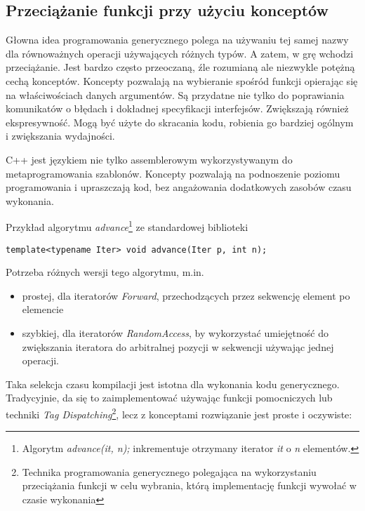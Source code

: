 \documentclass[11pt, a4paper]{article}
\begin{document}
\lstset{language=C++}

\subsection{Przeciążanie funkcji przy użyciu konceptów}

Głowna idea programowania generycznego polega na używaniu tej samej nazwy dla równoważnych operacji używających różnych typów. A zatem, w grę wchodzi przeciążanie. Jest bardzo często przeoczaną, źle rozumianą ale niezwykle potężną cechą konceptów. Koncepty pozwalają na wybieranie spośród funkcji opierając się na właściwościach danych argumentów. Są przydatne nie tylko do poprawiania komunikatów o błędach i dokładnej specyfikacji interfejsów. Zwiększają również ekspresywność. Mogą być użyte do skracania kodu, robienia go bardziej ogólnym i zwiększania wydajności.

C++ jest językiem nie tylko assemblerowym wykorzystywanym do metaprogramowania szablonów. Koncepty pozwalają na podnoszenie poziomu programowania i upraszczają kod, bez angażowania dodatkowych zasobów czasu wykonania.

Przykład algorytmu \emph{advance}\footnote{Algorytm \emph{advance(it, n);} inkrementuje otrzymany iterator \emph{it} o \emph{n} elementów.} ze standardowej biblioteki

\begin{lstlisting}[frame=single]
template<typename Iter> void advance(Iter p, int n);
\end{lstlisting}

Potrzeba różnych wersji tego algorytmu, m.in.
\begin{itemize}
\item prostej, dla iteratorów \emph{Forward}, przechodzących przez sekwencję element po elemencie
\item szybkiej, dla iteratorów \emph{RandomAccess}, by wykorzystać umiejętność do zwiększania iteratora do arbitralnej pozycji w sekwencji używając jednej operacji.
\end{itemize}

Taka selekcja czasu kompilacji jest istotna dla wykonania kodu generycznego. Tradycyjnie, da się to zaimplementować używając funkcji pomocniczych lub techniki \emph{Tag Dispatching}\footnote{Technika programowania generycznego polegająca na wykorzystaniu przeciążania funkcji w celu wybrania, którą implementację funkcji wywołać w czasie wykonania}, lecz z konceptami rozwiązanie jest proste i oczywiste:
\end{document}
